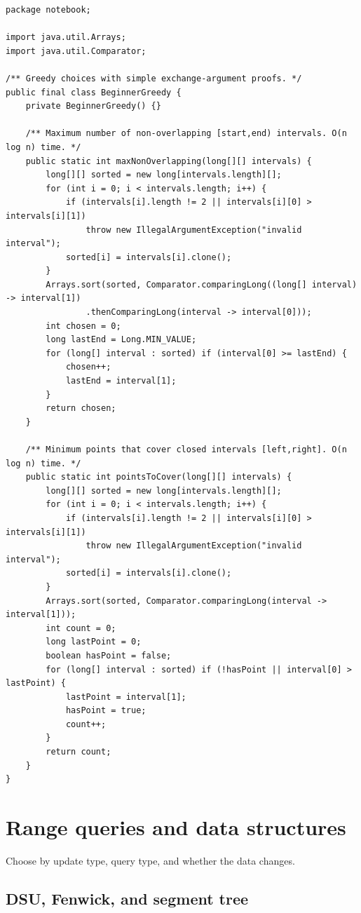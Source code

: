 \documentclass[10pt,letterpaper]{article}
\begin{document}
\begin{lstlisting}
package notebook;

import java.util.Arrays;
import java.util.Comparator;

/** Greedy choices with simple exchange-argument proofs. */
public final class BeginnerGreedy {
    private BeginnerGreedy() {}

    /** Maximum number of non-overlapping [start,end) intervals. O(n log n) time. */
    public static int maxNonOverlapping(long[][] intervals) {
        long[][] sorted = new long[intervals.length][];
        for (int i = 0; i < intervals.length; i++) {
            if (intervals[i].length != 2 || intervals[i][0] > intervals[i][1])
                throw new IllegalArgumentException("invalid interval");
            sorted[i] = intervals[i].clone();
        }
        Arrays.sort(sorted, Comparator.comparingLong((long[] interval) -> interval[1])
                .thenComparingLong(interval -> interval[0]));
        int chosen = 0;
        long lastEnd = Long.MIN_VALUE;
        for (long[] interval : sorted) if (interval[0] >= lastEnd) {
            chosen++;
            lastEnd = interval[1];
        }
        return chosen;
    }

    /** Minimum points that cover closed intervals [left,right]. O(n log n) time. */
    public static int pointsToCover(long[][] intervals) {
        long[][] sorted = new long[intervals.length][];
        for (int i = 0; i < intervals.length; i++) {
            if (intervals[i].length != 2 || intervals[i][0] > intervals[i][1])
                throw new IllegalArgumentException("invalid interval");
            sorted[i] = intervals[i].clone();
        }
        Arrays.sort(sorted, Comparator.comparingLong(interval -> interval[1]));
        int count = 0;
        long lastPoint = 0;
        boolean hasPoint = false;
        for (long[] interval : sorted) if (!hasPoint || interval[0] > lastPoint) {
            lastPoint = interval[1];
            hasPoint = true;
            count++;
        }
        return count;
    }
}
\end{lstlisting}
\section{Range queries and data structures}
\begin{guidebox}Choose by update type, query type, and whether the data changes.\end{guidebox}
\subsection{DSU, Fenwick, and segment tree}
\end{document}
